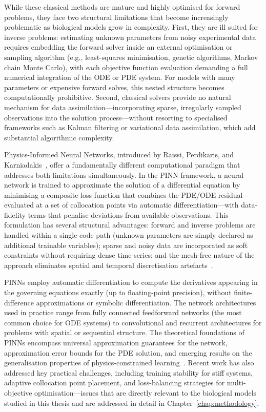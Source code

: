 \documentclass[14pt,a4paper,openany]{extbook}
\begin{document}
While these classical methods are mature and highly optimised for forward problems, they face two structural limitations that become increasingly problematic as biological models grow in complexity. First, they are ill suited for inverse problems: estimating unknown parameters from noisy experimental data requires embedding the forward solver inside an external optimisation or sampling algorithm (e.g., least-squares minimisation, genetic algorithms, Markov chain Monte Carlo), with each objective function evaluation demanding a full numerical integration of the ODE or PDE system. For models with many parameters or expensive forward solves, this nested structure becomes computationally prohibitive. Second, classical solvers provide no natural mechanism for data assimilation---incorporating sparse, irregularly sampled observations into the solution process---without resorting to specialised frameworks such as Kalman filtering or variational data assimilation, which add substantial algorithmic complexity.

Physics-Informed Neural Networks, introduced by Raissi, Perdikaris, and Karniadakis~\cite{raissi2019}, offer a fundamentally different computational paradigm that addresses both limitations simultaneously. In the PINN framework, a neural network is trained to approximate the solution of a differential equation by minimising a composite loss function that combines the PDE/ODE residual---evaluated at a set of collocation points via automatic differentiation---with data-fidelity terms that penalise deviations from available observations. This formulation has several structural advantages: forward and inverse problems are handled within a single code path (unknown parameters are simply declared as additional trainable variables); sparse and noisy data are incorporated as soft constraints without requiring dense time-series; and the mesh-free nature of the approach eliminates spatial and temporal discretisation artefacts~\cite{cuomo2022}.

PINNs employ automatic differentiation to compute the derivatives appearing in the governing equations exactly (up to floating-point precision), without finite-difference approximations or symbolic differentiation. The network architectures used in practice range from fully connected feedforward networks (the most common choice for ODE systems) to convolutional and recurrent architectures for problems with spatial or sequential structure. The theoretical foundations of PINNs encompass universal approximation guarantees for the network, approximation error bounds for the PDE solution, and emerging results on the generalisation properties of physics-constrained learning~\cite{cuomo2022}. Recent work has also addressed key practical challenges, including training stability for stiff systems, adaptive collocation point placement, and loss-balancing strategies for multi-objective optimisation---issues that are directly relevant to the biological models studied in this thesis and are addressed in detail in Chapter~\ref{chap:methodology}.
\end{document}

